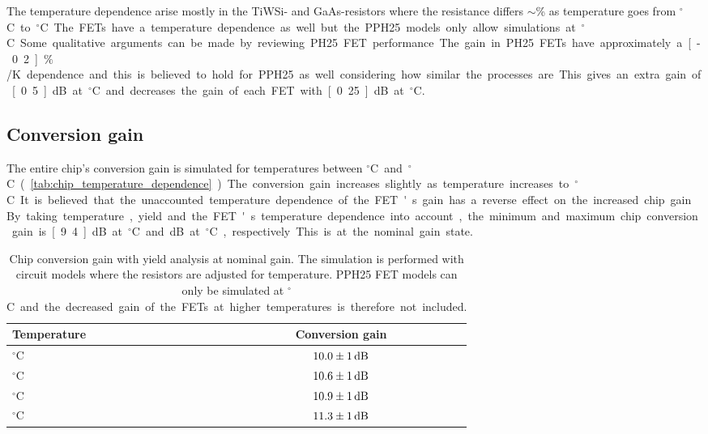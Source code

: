 			The temperature dependence arise mostly in the TiWSi- and GaAs-resistors where the resistance differs $\sim$\unit[10]{\%} as temperature goes from \unit[20]{$^\circ$C} to \unit[85]{$^\circ$C}. The FETs have a temperature dependence as well but the PPH25 models only allow simulations at \unit[20]{$^\circ$C}. Some qualitative arguments can be made by reviewing PH25 FET performance. The gain in PH25 FETs have approximately a \unit[-0.2]{$\%$/K} dependence and this is believed to hold for PPH25 as well considering how similar the processes are. This gives an extra gain of \unit[0.5]{dB} at \unit[-40]{$^\circ$C} and decreases the gain of each FET with \unit[0.25]{dB} at \unit[55]{$^\circ$C}.		

		\subsection{Conversion gain}
			The entire chip's conversion gain is simulated for temperatures between \unit[-40]{$^\circ$C} and \unit[85]{$^\circ$C} (\autoref{tab:chip_temperature_dependence}). The conversion gain increases slightly as temperature increases to \unit[85]{$^\circ$C}. It is believed that the unaccounted temperature dependence of the FET's gain has a reverse effect on the increased chip gain. %

			
		By taking temperature, yield and the FET's temperature dependence into account, the minimum and maximum chip conversion gain is \unit[9.4]{dB} at \unit[55]{$^\circ$C} and \unit[12]{dB} at \unit[-40]{$^\circ$C}, respectively. This is at the nominal gain state.


		\begin{table}[h!]
				\caption[Chip conversion gain temperature dependence]{Chip conversion gain with yield analysis at nominal gain. The simulation is performed with circuit models where the resistors are adjusted for temperature. PPH25 FET models can only be simulated at \unit[20]{$^\circ$C} and the decreased gain of the FETs at higher temperatures is therefore not included.}
				\label{tab:chip_temperature_dependence}
				\centering
				\begin{tabular}{ l c } \toprule %
					Temperature & Conversion gain \\\midrule
					\unit[-40]{$^\circ$C} 	& $\unit[10.0\pm1]{dB}$\\
					\unit[20]{$^\circ$C} 	& $\unit[10.6\pm1]{dB}$\\
					\unit[55]{$^\circ$C} 	& $\unit[10.9\pm1]{dB}$ \\
					\unit[85]{$^\circ$C}	& $\unit[11.3\pm1]{dB}$ \\\bottomrule
				\end{tabular}
			\end{table}			
	

